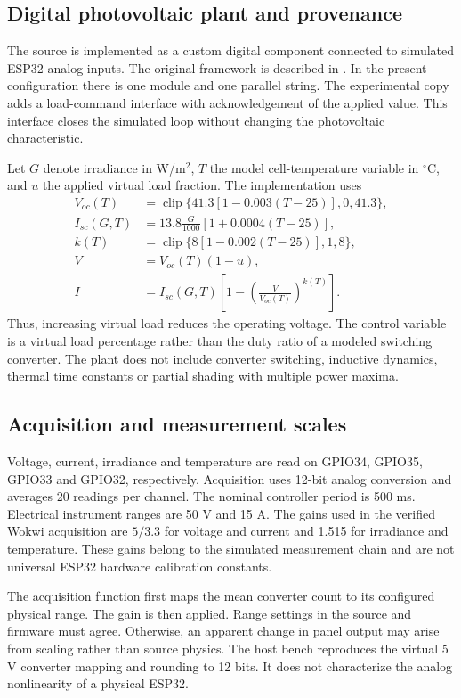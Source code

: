\documentclass[Acad.Energy.,researcharticle,9pt,twoside,oneauthor]{Definitions/jams_academia}
\begin{document}
\subsection{Digital photovoltaic plant and provenance}
The source is implemented as a custom digital component connected to simulated ESP32 analog inputs. The original framework is described in \cite{suarez}. In the present configuration there is one module and one parallel string. The experimental copy adds a load-command interface with acknowledgement of the applied value. This interface closes the simulated loop without changing the photovoltaic characteristic.

Let $G$ denote irradiance in W/m$^2$, $T$ the model cell-temperature variable in $^\circ$C, and $u$ the applied virtual load fraction. The implementation uses
\begin{align}
 V_{oc}(T)&=\operatorname{clip}\{41.3[1-0.003(T-25)],0,41.3\},\\
 I_{sc}(G,T)&=13.8\frac{G}{1000}[1+0.0004(T-25)],\\
 k(T)&=\operatorname{clip}\{8[1-0.002(T-25)],1,8\},\\
 V&=V_{oc}(T)(1-u),\\
 I&=I_{sc}(G,T)\left[1-\left(\frac{V}{V_{oc}(T)}\right)^{k(T)}\right].
\end{align}
Thus, increasing virtual load reduces the operating voltage. The control variable is a virtual load percentage rather than the duty ratio of a modeled switching converter. The plant does not include converter switching, inductive dynamics, thermal time constants or partial shading with multiple power maxima.

\subsection{Acquisition and measurement scales}
Voltage, current, irradiance and temperature are read on GPIO34, GPIO35, GPIO33 and GPIO32, respectively. Acquisition uses 12-bit analog conversion and averages 20 readings per channel. The nominal controller period is 500 ms. Electrical instrument ranges are 50 V and 15 A. The gains used in the verified Wokwi acquisition are $5/3.3$ for voltage and current and 1.515 for irradiance and temperature. These gains belong to the simulated measurement chain and are not universal ESP32 hardware calibration constants.

The acquisition function first maps the mean converter count to its configured physical range. The gain is then applied. Range settings in the source and firmware must agree. Otherwise, an apparent change in panel output may arise from scaling rather than source physics. The host bench reproduces the virtual 5 V converter mapping and rounding to 12 bits. It does not characterize the analog nonlinearity of a physical ESP32.
\end{document}
